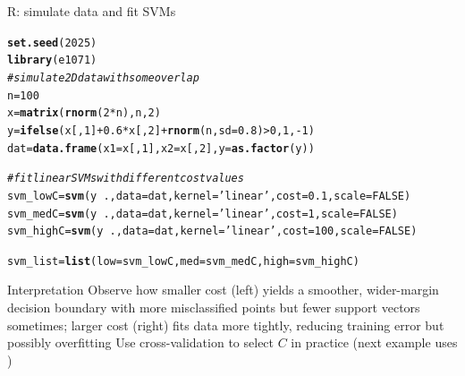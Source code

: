 \documentclass[aspectratio=169]{beamer}\usepackage[]{graphicx}\usepackage[]{xcolor}
\makeatletter
\newcommand{\hlnum}[1]{\textcolor[rgb]{0.686,0.059,0.569}{#1}}%
\newcommand{\hlsng}[1]{\textcolor[rgb]{0.192,0.494,0.8}{#1}}%
\newcommand{\hlcom}[1]{\textcolor[rgb]{0.678,0.584,0.686}{\textit{#1}}}%
\newcommand{\hlopt}[1]{\textcolor[rgb]{0,0,0}{#1}}%
\newcommand{\hldef}[1]{\textcolor[rgb]{0.345,0.345,0.345}{#1}}%
\newcommand{\hlkwb}[1]{\textcolor[rgb]{0.69,0.353,0.396}{#1}}%
\newcommand{\hlkwc}[1]{\textcolor[rgb]{0.333,0.667,0.333}{#1}}%
\newcommand{\hlkwd}[1]{\textcolor[rgb]{0.737,0.353,0.396}{\textbf{#1}}}%
\newenvironment{kframe}{%
 \def\at@end@of@kframe{}%
 \ifinner\ifhmode%
  \def\at@end@of@kframe{\end{minipage}}%
  \begin{minipage}{\columnwidth}%
 \fi\fi%
 \def\FrameCommand##1{\hskip\@totalleftmargin \hskip-\fboxsep
 \colorbox{shadecolor}{##1}\hskip-\fboxsep
     \hskip-\linewidth \hskip-\@totalleftmargin \hskip\columnwidth}%
 \MakeFramed {\advance\hsize-\width
   \@totalleftmargin\z@ \linewidth\hsize
   \@setminipage}}%
 {\par\unskip\endMakeFramed%
 \at@end@of@kframe}
\newenvironment{knitrout}{}{} %
\makeatother
\begin{document}
\begin{frame}[fragile]{R: simulate data and fit SVMs}
\begin{knitrout}
\color{fgcolor}\begin{kframe}
\begin{alltt}
\hlkwd{set.seed}\hldef{(}\hlnum{2025}\hldef{)}
\hlkwd{library}\hldef{(e1071)}
\hlcom{# simulate 2D data with some overlap}
\hldef{n} \hlkwb{=} \hlnum{100}
\hldef{x} \hlkwb{=} \hlkwd{matrix}\hldef{(}\hlkwd{rnorm}\hldef{(}\hlnum{2}\hlopt{*}\hldef{n), n,} \hlnum{2}\hldef{)}
\hldef{y} \hlkwb{=} \hlkwd{ifelse}\hldef{(x[,}\hlnum{1}\hldef{]} \hlopt{+} \hlnum{0.6}\hlopt{*}\hldef{x[,}\hlnum{2}\hldef{]} \hlopt{+} \hlkwd{rnorm}\hldef{(n,} \hlkwc{sd}\hldef{=}\hlnum{0.8}\hldef{)} \hlopt{>} \hlnum{0}\hldef{,} \hlnum{1}\hldef{,} \hlopt{-}\hlnum{1}\hldef{)}
\hldef{dat} \hlkwb{=} \hlkwd{data.frame}\hldef{(}\hlkwc{x1} \hldef{= x[,}\hlnum{1}\hldef{],} \hlkwc{x2} \hldef{= x[,}\hlnum{2}\hldef{],} \hlkwc{y} \hldef{=} \hlkwd{as.factor}\hldef{(y))}

\hlcom{# fit linear SVMs with different cost values}
\hldef{svm_lowC}  \hlkwb{=} \hlkwd{svm}\hldef{(y} \hlopt{~} \hldef{.,} \hlkwc{data} \hldef{= dat,} \hlkwc{kernel} \hldef{=} \hlsng{'linear'}\hldef{,} \hlkwc{cost} \hldef{=} \hlnum{0.1}\hldef{,} \hlkwc{scale} \hldef{=} \hlnum{FALSE}\hldef{)}
\hldef{svm_medC}  \hlkwb{=} \hlkwd{svm}\hldef{(y} \hlopt{~} \hldef{.,} \hlkwc{data} \hldef{= dat,} \hlkwc{kernel} \hldef{=} \hlsng{'linear'}\hldef{,} \hlkwc{cost} \hldef{=} \hlnum{1}\hldef{,}   \hlkwc{scale} \hldef{=} \hlnum{FALSE}\hldef{)}
\hldef{svm_highC} \hlkwb{=} \hlkwd{svm}\hldef{(y} \hlopt{~} \hldef{.,} \hlkwc{data} \hldef{= dat,} \hlkwc{kernel} \hldef{=} \hlsng{'linear'}\hldef{,} \hlkwc{cost} \hldef{=} \hlnum{100}\hldef{,} \hlkwc{scale} \hldef{=} \hlnum{FALSE}\hldef{)}

\hldef{svm_list} \hlkwb{=} \hlkwd{list}\hldef{(}\hlkwc{low} \hldef{= svm_lowC,} \hlkwc{med} \hldef{= svm_medC,} \hlkwc{high} \hldef{= svm_highC)}
\end{alltt}
\end{kframe}
\end{knitrout}
\end{frame}





\begin{frame}{Interpretation}
    Observe how smaller cost (left) yields a smoother, wider-margin decision boundary with more misclassified points but fewer support vectors sometimes; larger cost (right) fits data more tightly, reducing training error but possibly overfitting
    \vfill
    Use cross-validation to select $C$ in practice (next example uses )
\end{frame}
\end{document}
